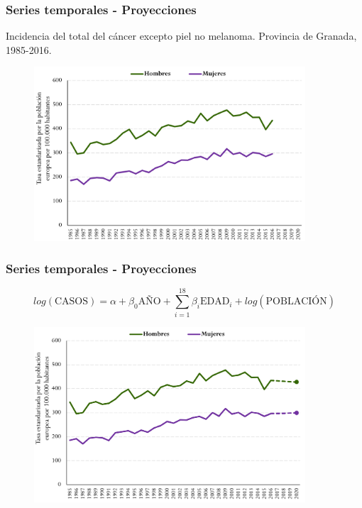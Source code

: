 \documentclass{beamer}
\begin{document}

\begin{frame}\frametitle{Series temporales - Proyecciones}
	
	\footnotesize{Incidencia del total del cáncer excepto piel no melanoma. Provincia de Granada, 1985-2016.}
	\begin{figure}
		\centering
		\includegraphics[width=0.9\textwidth]{images/proyecciones0.png}
	\end{figure}
		
\end{frame}

\begin{frame}\frametitle{Series temporales - Proyecciones}
	
	\vspace{-20pt}
	\centering
	$$log(\text{CASOS}) = \alpha + \beta_0 \text{AÑO} + \sum_{i = 1}^{18} \beta_i \text{EDAD}_i + log(\text{POBLACIÓN})$$
	\vspace{-10pt}
	\begin{figure}
		\centering
		\includegraphics[width=0.9\textwidth]{images/proyecciones1.png}
	\end{figure}
	
\end{frame}
\end{document}
